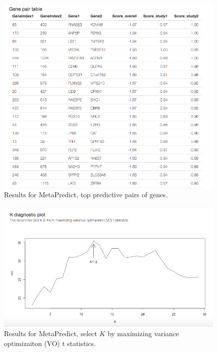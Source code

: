 \begin{figure}[H]
\begin{center}
\includegraphics[scale=0.5]{./figure/MetaPredict/MetaPredictresult1.png}
\caption{Results for MetaPredict, top predictive pairs of genes.}
\label{fig:MetaPredictresult1}
\end{center}
\end{figure}


\begin{figure}[H]
\begin{center}
\includegraphics[scale=0.5]{./figure/MetaPredict/MetaPredictresult2.png}
\caption{Results for MetaPredict, select $K$ by maximizing variance optimizaiton (VO) t statistics.}
\label{fig:MetaPredictresult2}
\end{center}
\end{figure}



